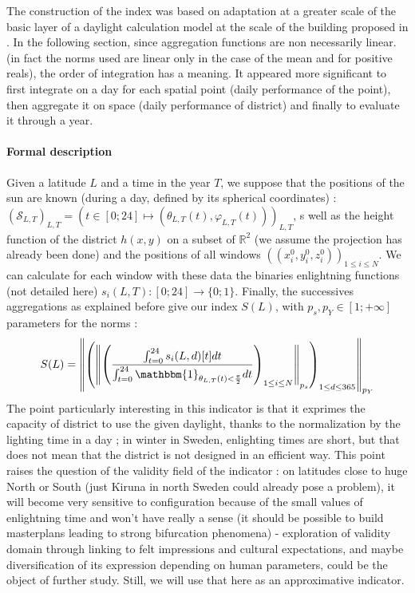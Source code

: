 \documentclass[english]{article}
\begin{document}
\bigskip{}


The construction of the index was based on adaptation at a greater
scale of the basic layer of a daylight calculation model at the
scale of the building proposed in \cite{miguet2002daylight}. In the
following section, since aggregation functions are non necessarily linear.
(in fact the norms used are linear only in the case of the mean and
for positive reals), the order of integration has a meaning. It
appeared more significant to first integrate on a day for each spatial
point (daily performance of the point), then aggregate it on space
(daily performance of district) and finally to evaluate it through
a year.

\bigskip{}



\paragraph{Formal description}

Given a latitude $L$ and a time in the year $T$, we suppose that
the positions of the sun are known (during a day, defined by its spherical coordinates)
: $(\mathcal{S}_{L,T})_{L,T}=(t\in[0;24]\mapsto(\theta_{L,T}(t),\varphi_{L,T}(t)))_{L,T}$, 
s well as the height function of the district $h(x,y)$ on a subset of $\mathbb{R}^{2}$
(we assume the projection has already been done) and the positions
of all windows $((x_{i}^{0},y_{i}^{0},z_{i}^{0}))_{1\leq i\leq N}$.
We can calculate for each window with these data the binaries enlightning
functions (not detailed here) $s_{i}(L,T):[0;24]\rightarrow\{0;1\}$.
Finally, the successives aggregations as explained before give our
index $S(L)$, with $p_{s},p_{Y}\in[1;+\infty]$ parameters for the
norms : \[S(L)=\left\Vert \left(\left\Vert \left(\frac{\intop_{t=0}^{24}s_{i}(L,d)[t]dt}{\intop_{t=0}^{24}\mathbbm{1}_{\theta_{L,T}(t)<\frac{\pi}{2}}dt}\right)_{1\leq i\leq N}\right\Vert _{p_{s}}\right)_{1\leq d\leq365}\right\Vert _{p_{Y}} \]The
point particularly interesting in this indicator is that it exprimes
the capacity of district to use the given daylight, thanks to the
normalization by the lighting time in a day ; in winter in Sweden,
enlighting times are short, but that does not mean that the district
is not designed in an efficient way. This point raises the question
of the validity field of the indicator : on latitudes close to huge
North or South (just Kiruna in north Sweden could already pose a problem),
it will become very sensitive to configuration because of the small
values of enlightning time and won't have really a sense (it should
be possible to build masterplans leading to strong bifurcation phenomena)
- exploration of validity domain through linking to felt impressions
and cultural expectations, and maybe diversification of its expression
depending on human parameters, could be the object of further study.
Still, we will use that here as an approximative indicator.
\end{document}
